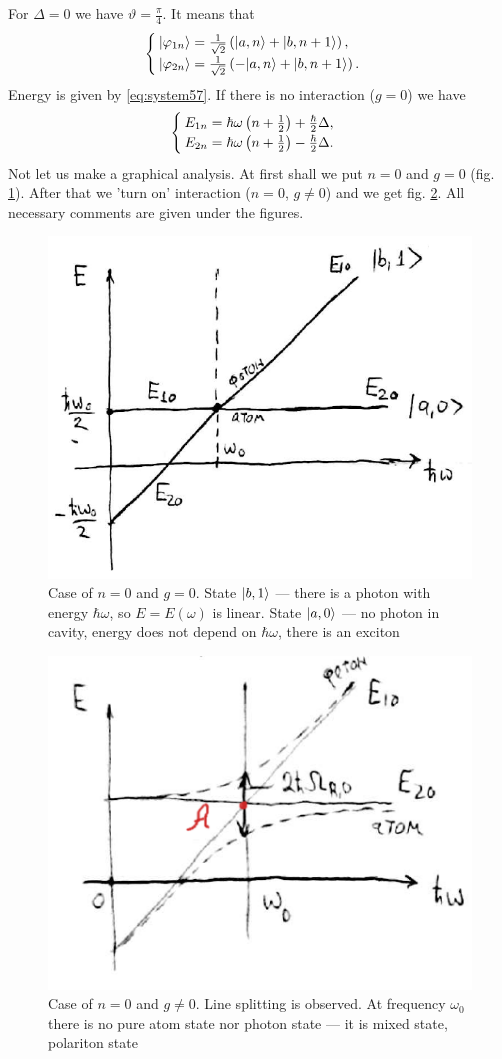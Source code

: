 For $\Delta = 0$ we have $\vartheta = \frac{\pi}{4}$. It means that
\begin{equation}
	\begin{cases}
		\lvert\varphi_{1n}\rangle = \frac{1}{\sqrt{2}} \left(\lvert a, n\rangle + \lvert b ,n +1\rangle\right), \\
		\lvert\varphi_{2n}\rangle = \frac{1}{\sqrt{2}}\left(-\lvert a, n\rangle + \lvert b ,n +1\rangle\right).
	\end{cases}
\end{equation}
Energy is given by \eqref{eq:system57}. If there is no interaction ($g = 0$) we have
\begin{equation}
	\begin{cases}
		E_{1n} = \hbar \omega \left( n + \frac{1}{2}\right) + \frac{\hbar}{2} \Delta, \\
		E_{2n} = \hbar \omega \left( n + \frac{1}{2}\right) - \frac{\hbar}{2} \Delta.
	\end{cases}
\end{equation}
Not let us make a graphical analysis. At first shall we put $n=0$ and $g=0$ (fig. \ref{fig:n0}). After that we 'turn on' interaction ($n=0$, $g \neq 0$) and we get fig. \ref{fig:n0gne0}. All necessary comments are given under the figures.

\begin{figure}
	\centering
	\includegraphics[width=0.5\linewidth]{fig/L6/n0}
	\caption{Case of $n=0$ and $g=0$. State $\lvert b,1\rangle$ --- there is a photon with energy $\hbar \omega$, so $E = E(\omega)$ is linear. State $\lvert a,0\rangle$ --- no photon in cavity, energy does not depend on $\hbar \omega$, there is an exciton}
	\label{fig:n0}
\end{figure}
\begin{figure}
	\centering
	\includegraphics[width=0.5\linewidth]{fig/L6/n0_g_ne0}
	\caption{Case of $n=0$ and $g\neq0$. Line splitting is observed. At frequency $\omega_0$ there is no pure atom state nor photon state --- it is mixed state, polariton state}
	\label{fig:n0gne0}
\end{figure}

